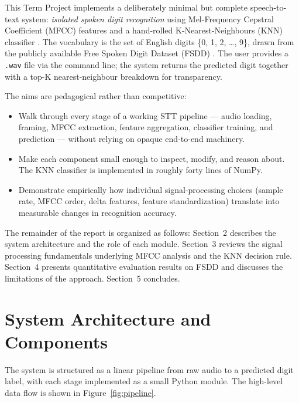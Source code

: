 \documentclass[12pt,a4paper]{article}
\begin{document}
This Term Project implements a deliberately minimal but complete
speech-to-text system: \emph{isolated spoken digit recognition} using
Mel-Frequency Cepstral Coefficient (MFCC) features and a hand-rolled
K-Nearest-Neighbours (KNN) classifier \cite{cover1967nearest,fix1951discriminatory}.
The vocabulary is the set of English digits \{0, 1, 2, \ldots, 9\}, drawn
from the publicly available Free Spoken Digit Dataset (FSDD)
\cite{fsdd}. The user provides a \texttt{.wav} file via the command line;
the system returns the predicted digit together with a top-K nearest-neighbour
breakdown for transparency.

The aims are pedagogical rather than competitive:
\begin{itemize}
    \item Walk through every stage of a working STT pipeline --- audio
          loading, framing, MFCC extraction, feature aggregation, classifier
          training, and prediction --- without relying on opaque
          end-to-end machinery.
    \item Make each component small enough to inspect, modify, and reason
          about. The KNN classifier is implemented in roughly forty lines of
          NumPy.
    \item Demonstrate empirically how individual signal-processing choices
          (sample rate, MFCC order, delta features, feature standardization)
          translate into measurable changes in recognition accuracy.
\end{itemize}

The remainder of the report is organized as follows: Section~2 describes the
system architecture and the role of each module. Section~3 reviews the signal
processing fundamentals underlying MFCC analysis and the KNN decision rule.
Section~4 presents quantitative evaluation results on FSDD and discusses the
limitations of the approach. Section~5 concludes.

\section{System Architecture and Components}

The system is structured as a linear pipeline from raw audio to a predicted
digit label, with each stage implemented as a small Python module. The
high-level data flow is shown in Figure~\ref{fig:pipeline}.
\end{document}
